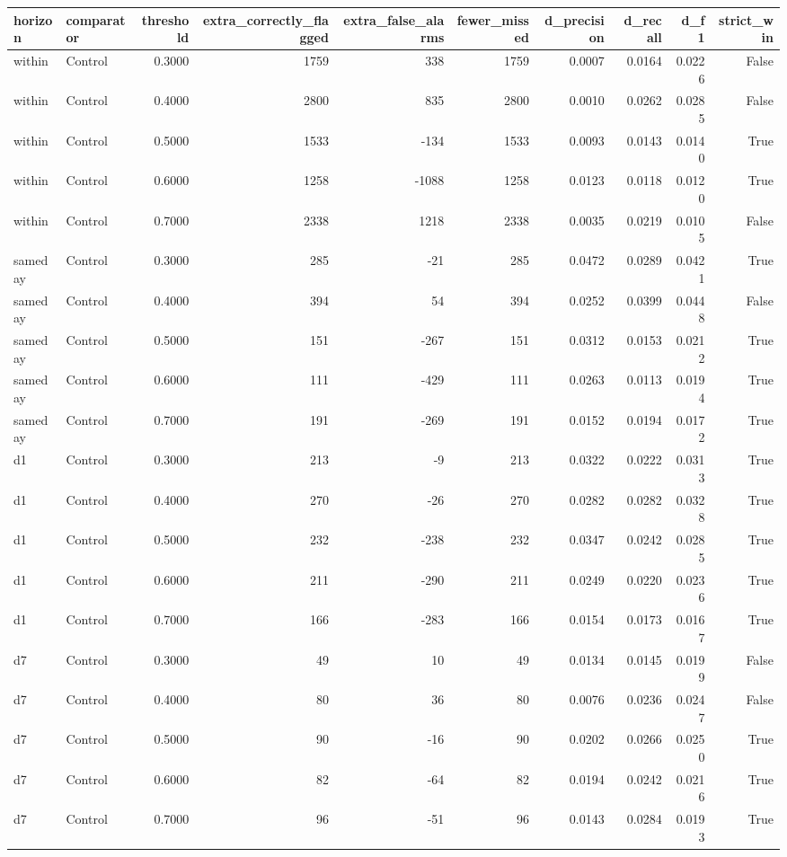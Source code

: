 \begin{tabular}{llrrrrrrrr}
\toprule
horizon & comparator & threshold & extra\_correctly\_flagged & extra\_false\_alarms & fewer\_missed & d\_precision & d\_recall & d\_f1 & strict\_win \\
\midrule
within & Control & 0.3000 & 1759 & 338 & 1759 & 0.0007 & 0.0164 & 0.0226 & False \\
within & Control & 0.4000 & 2800 & 835 & 2800 & 0.0010 & 0.0262 & 0.0285 & False \\
within & Control & 0.5000 & 1533 & -134 & 1533 & 0.0093 & 0.0143 & 0.0140 & True \\
within & Control & 0.6000 & 1258 & -1088 & 1258 & 0.0123 & 0.0118 & 0.0120 & True \\
within & Control & 0.7000 & 2338 & 1218 & 2338 & 0.0035 & 0.0219 & 0.0105 & False \\
sameday & Control & 0.3000 & 285 & -21 & 285 & 0.0472 & 0.0289 & 0.0421 & True \\
sameday & Control & 0.4000 & 394 & 54 & 394 & 0.0252 & 0.0399 & 0.0448 & False \\
sameday & Control & 0.5000 & 151 & -267 & 151 & 0.0312 & 0.0153 & 0.0212 & True \\
sameday & Control & 0.6000 & 111 & -429 & 111 & 0.0263 & 0.0113 & 0.0194 & True \\
sameday & Control & 0.7000 & 191 & -269 & 191 & 0.0152 & 0.0194 & 0.0172 & True \\
d1 & Control & 0.3000 & 213 & -9 & 213 & 0.0322 & 0.0222 & 0.0313 & True \\
d1 & Control & 0.4000 & 270 & -26 & 270 & 0.0282 & 0.0282 & 0.0328 & True \\
d1 & Control & 0.5000 & 232 & -238 & 232 & 0.0347 & 0.0242 & 0.0285 & True \\
d1 & Control & 0.6000 & 211 & -290 & 211 & 0.0249 & 0.0220 & 0.0236 & True \\
d1 & Control & 0.7000 & 166 & -283 & 166 & 0.0154 & 0.0173 & 0.0167 & True \\
d7 & Control & 0.3000 & 49 & 10 & 49 & 0.0134 & 0.0145 & 0.0199 & False \\
d7 & Control & 0.4000 & 80 & 36 & 80 & 0.0076 & 0.0236 & 0.0247 & False \\
d7 & Control & 0.5000 & 90 & -16 & 90 & 0.0202 & 0.0266 & 0.0250 & True \\
d7 & Control & 0.6000 & 82 & -64 & 82 & 0.0194 & 0.0242 & 0.0216 & True \\
d7 & Control & 0.7000 & 96 & -51 & 96 & 0.0143 & 0.0284 & 0.0193 & True \\

\end{tabular}
